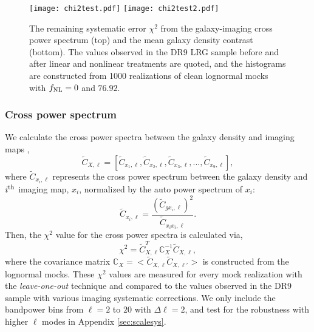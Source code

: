 \begin{figure}
\raggedleft
\texttt{[image: chi2test.pdf]}
\texttt{[image: chi2test2.pdf]}
\caption{The remaining systematic error $\chi^{2}$ from the galaxy-imaging cross power spectrum (top) and the mean galaxy density contrast (bottom). The values observed in the DR9 LRG sample before and after linear and nonlinear treatments are quoted, and the histograms are constructed from 1000 realizations of clean lognormal mocks with $f_{\rm NL}=0$ and $76.92$. }\label{fig:chi2test}
\end{figure}


\subsubsection{Cross power spectrum}

We calculate the cross power spectra between the galaxy density and imaging  maps ,
\begin{equation}
\tilde{C}_{X, \ell} = [\tilde{C}_{x_{1}, \ell}, \tilde{C}_{x_{2}, \ell}, \tilde{C}_{x_{3}, \ell}, ..., \tilde{C}_{x_{9}, \ell}],
\end{equation}
where $\tilde{C}_{x_{i}, \ell}$ represents the cross power spectrum between the galaxy density and $i^{\rm th}$ imaging map, $x_{i}$, normalized by the auto power spectrum of $x_{i}$:
\begin{equation}
\tilde{C}_{x_{i}, \ell} = \frac{(\tilde{C}_{gx_{i}, \ell})^{2}}{\tilde{C}_{x_{i}x_{i},\ell}}.
\end{equation}
Then, the $\chi^{2}$ value for the cross power spectra is calculated via,
\begin{equation}
\chi^{2} = \tilde{C}^{T}_{X, \ell} \mathbb{C}_{X}^{-1} \tilde{C}_{X, \ell},
\end{equation}
where the covariance matrix $\mathbb{C}_{X} = < \tilde{C}_{X, \ell} \tilde{C}_{X, \ell'} >$ is constructed from the lognormal mocks. These $\chi^{2}$ values are measured for every mock realization with the \textit{leave-one-out} technique and compared to the values observed in the DR9 sample with various imaging systematic corrections.   We only include the bandpower bins from $\ell=2$ to $20$ with $\Delta\ell=2$, and test for the robustness with higher $\ell$ modes in Appendix \ref{sec:scalesys}. 

